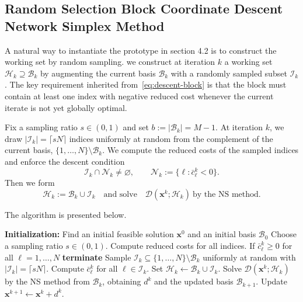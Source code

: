 \documentclass[12pt,a4paper]{article}
\begin{document}

\subsection{Random Selection Block Coordinate Descent Network Simplex Method}
\label{subsec:rs-bcdns}

A natural way to instantiate the prototype in section 4.2 is to
construct the working set by random sampling.
we construct at iteration $k$ a working set
$\mathcal{H}_k \supseteq \mathcal{B}_k$ by augmenting the current basis
$\mathcal{B}_k$ with a randomly sampled subset $\mathcal{I}_k$.
The key requirement inherited from~\eqref{eq:descent-block} is that the block
must contain at least one index with negative reduced cost whenever the current
iterate is not yet globally optimal.

\medskip

Fix a sampling ratio $s \in (0,1)$ and set $b:=\lvert \mathcal{B}_k\rvert = M-1$.
At iteration $k$, we draw $\lvert \mathcal{I}_k\rvert = \lceil sN\rceil$ indices
uniformly at random from the complement of the current basis,
$\{1,\dots,N\}\setminus \mathcal{B}_k$.
We compute the reduced costs of the sampled indices and enforce the descent condition
\[
\mathcal{I}_k \cap \mathcal{N}_k \neq \varnothing,
\qquad
\mathcal{N}_k:=\{\ell: \bar c^k_\ell<0\}.
\]
Then we form
\[
\mathcal{H}_k := \mathcal{B}_k \cup \mathcal{I}_k
\quad\text{and solve}\quad
\mathcal{D}(\mathbf{x}^k;\mathcal{H}_k)
\ \text{by the NS method.}
\]

\medskip

The algorithm is presented below.

\begin{algorithm}[H]
\caption{Random Selection Block Coordinate Descent Network Simplex Method (RS-BCDNS)}
\label{alg:rs-bcdns}
\begin{algorithmic}
\State \textbf{Initialization:}
Find an initial feasible solution $\mathbf{x}^0$ and an initial basis $\mathcal{B}_0$
Choose a sampling ratio $s\in(0,1)$.
    \State Compute reduced costs for all indices. If {$\bar c^k_\ell \ge 0$ for all $\ell=1,\dots,N$} \textbf{terminate} 
    \Repeat
        \State Sample $\mathcal{I}_k \subseteq \{1,\dots,N\}\setminus\mathcal{B}_k$
        uniformly at random with $\lvert \mathcal{I}_k\rvert=\lceil sN\rceil$.
        \State Compute $\bar c^k_\ell$ for all $\ell\in\mathcal{I}_k$.
    \State Set $\mathcal{H}_k \gets \mathcal{B}_k \cup \mathcal{I}_k$.
    \State 
    Solve $\mathcal{D}(\mathbf{x}^k;\mathcal{H}_k)$ by the NS method from $\mathcal{B}_k$, obtaining $d^k$ and the updated basis $\mathcal{B}_{k+1}$.
    \State Update $\mathbf{x}^{k+1}\gets \mathbf{x}^k + d^k$.
\EndFor
\end{algorithmic}
\end{algorithm}
\end{document}
